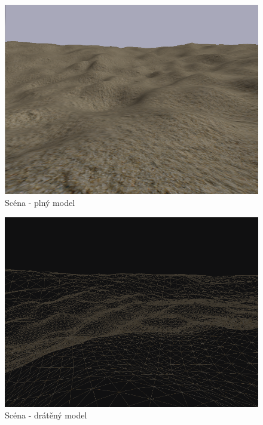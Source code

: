 \documentclass{zcu_sp}
\begin{document}
\begin{figure}[ht!]
\centering
	\includegraphics[width=15cm]{1.png}
	\caption{Scéna - plný model}
\end{figure}

\begin{figure}[ht!]
\centering
	\includegraphics[width=15cm]{4.png}
	\caption{Scéna - drátěný model}
\end{figure}

\clearpage
\end{document}
